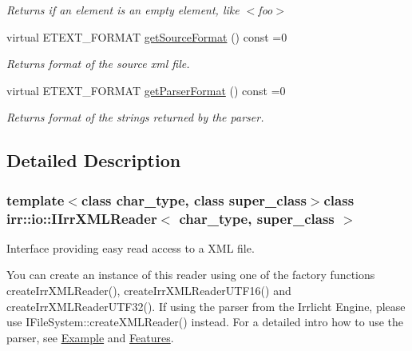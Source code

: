 \begin{DoxyCompactItemize}
\begin{DoxyCompactList}\small\item\em Returns if an element is an empty element, like $<$foo$>$ \end{DoxyCompactList}\item 
virtual E\+T\+E\+X\+T\+\_\+\+F\+O\+R\+M\+A\+T \hyperlink{classirr_1_1io_1_1_i_irr_x_m_l_reader_a00998ef2d3a562d6b2b8302c3430322d}{get\+Source\+Format} () const =0
\begin{DoxyCompactList}\small\item\em Returns format of the source xml file. \end{DoxyCompactList}\item 
virtual E\+T\+E\+X\+T\+\_\+\+F\+O\+R\+M\+A\+T \hyperlink{classirr_1_1io_1_1_i_irr_x_m_l_reader_a9af7e323c292a4836bf4a7c093b4d85a}{get\+Parser\+Format} () const =0
\begin{DoxyCompactList}\small\item\em Returns format of the strings returned by the parser. \end{DoxyCompactList}\end{DoxyCompactItemize}


\subsection{Detailed Description}
\subsubsection*{template$<$class char\+\_\+type, class super\+\_\+class$>$class irr\+::io\+::\+I\+Irr\+X\+M\+L\+Reader$<$ char\+\_\+type, super\+\_\+class $>$}

Interface providing easy read access to a X\+M\+L file. 

You can create an instance of this reader using one of the factory functions create\+Irr\+X\+M\+L\+Reader(), create\+Irr\+X\+M\+L\+Reader\+U\+T\+F16() and create\+Irr\+X\+M\+L\+Reader\+U\+T\+F32(). If using the parser from the Irrlicht Engine, please use I\+File\+System\+::create\+X\+M\+L\+Reader() instead. For a detailed intro how to use the parser, see \hyperlink{irrXML.h_irrxmlexample}{Example} and \hyperlink{irrXML.h_features}{Features}.

